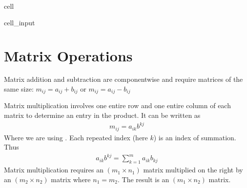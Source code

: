 \documentclass[letterpaper,10pt,english]{jupyterBook}
\begin{document}
\begin{sphinxuseclass}{cell}\begin{sphinxVerbatimInput}

\begin{sphinxuseclass}{cell_input}
\begin{sphinxVerbatim}[commandchars=\\\{\}]
    \PYG{p}{[}\PYG{p}{]}\PYG{p}{[}\PYG{p}{]}
 
\end{sphinxVerbatim}

\end{sphinxuseclass}\end{sphinxVerbatimInput}

\end{sphinxuseclass}

\section{Matrix Operations}
\label{\detokenize{lessons/Matrices-student:matrix-operations}}
\sphinxAtStartPar
Matrix addition and subtraction are componentwise and require matrices of the same size: \(m_{ij} = a_{ij} + b_{ij}\) or  \(m_{ij} = a_{ij} - b_{ij}\)

\sphinxAtStartPar
Matrix multiplication involves one entire row and one entire column of each matrix to determine an entry in the product. It can be written as
\begin{equation*}
\begin{split}m_{ij} = a_{ik}b^{kj}\end{split}
\end{equation*}
\sphinxAtStartPar
Where we are using . Each repeated index (here \(k\)) is an index of summation. Thus
\begin{equation*}
\begin{split}a_{ik}b^{kj} = \sum_{k=1}^m a_{ik}b_{kj}\end{split}
\end{equation*}
\sphinxAtStartPar
Matrix multiplication requires an \((m_1 \times n_1)\) matrix multiplied on the right by an \((m_2 \times n_2)\) matrix where \(n_1 = m_2\). The result is an \((m_1 \times n_2)\) matrix.
\end{document}

